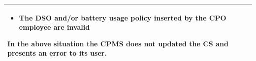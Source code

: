 \documentclass[11pt]{article}
\begin{document}
\begin{description}
\begin{table}[H]
\begin{tabularx}{\textwidth}{|>{\hsize=0.5\hsize}X|>{\hsize=1.5\hsize}X|}
\begin{minipage}[t]{\hsize}
                \begin{itemize}[topsep=0pt, leftmargin=*]
                    \item The DSO and/or battery usage policy inserted by the CPO employee are invalid
                \end{itemize}
                \vspace{8pt}
                \end{minipage}
                In the above situation the CPMS does not updated the CS and presents an error to its user.
                \vspace{6pt}
            \\
            \hline
        \end{tabularx}
    \end{table}
    
    \newpage
    

\end{description}
\end{document}
